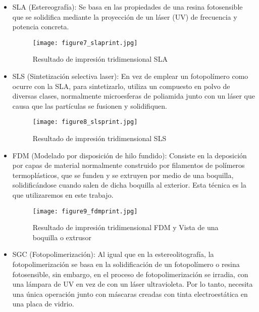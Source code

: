 	\begin{itemize}
		\item SLA (Estereografía): Se basa en las propiedades de una resina fotosensible que se solidifica mediante la proyección de un láser (UV) de frecuencia y potencia concreta.
		
		\begin{figure}[h]
			\centering
			\texttt{[image: figure7\_slaprint.jpg]}
			\caption{Resultado de impresión tridimensional SLA}
		\end{figure}
	
		\newpage
		\thispagestyle{plain}
			
		\item SLS (Sintetización selectiva laser): En vez de emplear un fotopolímero como ocurre con la SLA, para sintetizarlo, utiliza un compuesto en polvo de diversas clases, normalmente microesferas de poliamida junto con un láser que causa que las partículas se fusionen y solidifiquen. 
		
		\begin{figure}[h]
			\centering
			\texttt{[image: figure8\_slsprint.jpg]}
			\caption{Resultado de impresión tridimensional SLS}
		\end{figure}
		
		\item FDM (Modelado por disposición de hilo fundido): Consiste en la deposición por capas de material normalmente construido por filamentos de polímeros termoplásticos, que se funden y se extruyen por medio de una boquilla, solidificándose cuando salen de dicha boquilla al exterior. Esta técnica es la que utilizaremos en este trabajo.
		
		\begin{figure}[h]
			\centering
			\texttt{[image: figure9\_fdmprint.jpg]}
			\caption{Resultado de impresión tridimensional FDM y Vista de una boquilla o extrusor}
		\end{figure}
	
		\newpage
		\thispagestyle{plain}
		
		\item SGC (Fotopolimerización): Al igual que en la estereolitografía, la fotopolimerización se basa en la solidificación de
		un fotopolímero o resina fotosensible, sin embargo, en el proceso de
		fotopolimerización se irradia, con una lámpara de UV en vez de con un láser
		ultravioleta. Por lo tanto, necesita una única operación junto con máscaras creadas
		con tinta electroestática en una placa de vidrio.


\end{itemize}
